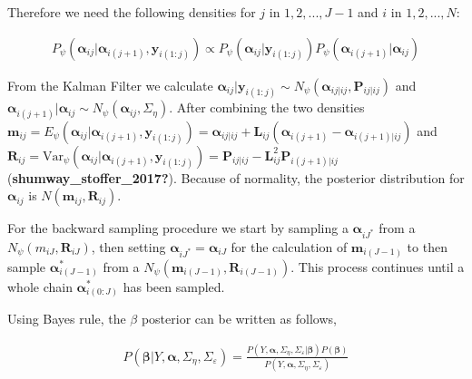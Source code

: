 \documentclass[
]{article}
\begin{document}
Therefore we need the following densities for \(j\) in \(1, 2, ..., J-1\) and \(i\) in \(1, 2, ..., N\):

\begin{equation*}
\begin{aligned}
P_\psi(\boldsymbol{\alpha}_{ij}|\boldsymbol{\alpha}_{i(j+1)}, \boldsymbol{y}_{i(1:j)}) \propto P_\psi(\boldsymbol{\alpha}_{ij}| \boldsymbol{y}_{i(1:j)})P_\psi(\boldsymbol{\alpha}_{i(j+1)}| \boldsymbol{\alpha}_{ij})
\end{aligned}
\end{equation*}

From the Kalman Filter we calculate \(\boldsymbol{\alpha}_{ij}|\boldsymbol{y}_{i(1:j)} \sim N_\psi(\boldsymbol{\alpha}_{ij|ij}, \boldsymbol{P}_{ij|ij})\) and \(\boldsymbol{\alpha}_{i(j+1)}|\boldsymbol{\alpha}_{ij} \sim N_\psi(\boldsymbol{\alpha}_{ij}, \Sigma_\eta)\). After combining the two densities \(\boldsymbol{m}_{ij} = E_\psi(\boldsymbol{\alpha}_{ij}| \boldsymbol{\alpha}_{i(j+1)},\boldsymbol{y}_{i(1:j)}) = \boldsymbol{\alpha}_{ij|ij} + \boldsymbol{L}_{ij} (\boldsymbol{\alpha}_{i(j+1)} - \boldsymbol{\alpha}_{i(j+1)|ij})\) and \(\boldsymbol{R}_{ij} = \text{Var}_\psi(\boldsymbol{\alpha}_{ij}| \boldsymbol{\alpha}_{i(j+1)},\boldsymbol{y}_{i(1:j)})= \boldsymbol{P}_{ij|ij} - \boldsymbol{L}_{ij}^2 \boldsymbol{P}_{i(j+1)|ij}\) (\textbf{shumway\_stoffer\_2017?}). Because of normality, the posterior distribution for \(\boldsymbol{\alpha}_{ij}\) is \(N(\boldsymbol{m}_{ij}, \boldsymbol{R}_{ij})\).

For the backward sampling procedure we start by sampling a \(\boldsymbol{\alpha}_{iJ^*}\) from a \(N_\psi(m_{iJ}, \boldsymbol{R}_{iJ})\), then setting \(\boldsymbol{\alpha}_{iJ^*} = \boldsymbol{\alpha}_{iJ}\) for the calculation of \(\boldsymbol{m}_{i(J-1)}\) to then sample \(\boldsymbol{\alpha}_{i(J-1)}^*\) from a \(N_\psi(\boldsymbol{m}_{i(J-1)}, \boldsymbol{R}_{i(J-1)})\). This process continues until a whole chain \(\boldsymbol{\alpha}_{i(0:J)}^*\) has been sampled.

Using Bayes rule, the \(\beta\) posterior can be written as follows,

\begin{equation*}
\begin{aligned}
P(\boldsymbol{\beta}|Y, \boldsymbol{\alpha}, \Sigma_\eta, \Sigma_\varepsilon) = \frac{P(Y, \boldsymbol{\alpha}, \Sigma_\eta, \Sigma_\varepsilon|\boldsymbol{\beta})P(\boldsymbol{\beta})}{P(Y, \boldsymbol{\alpha}, \Sigma_\eta, \Sigma_\varepsilon)}
\end{aligned}
\end{equation*}
\end{document}

